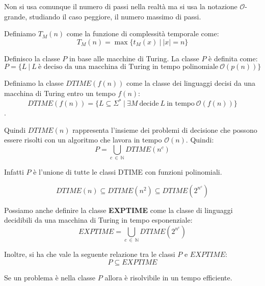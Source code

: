 Non si usa comunque il numero di passi nella realtà ma si usa la notazione 
$\mathcal{O}$-grande, studiando il caso peggiore, il numero massimo di passi.
\begin{definizione}
    Definiamo $T_M(n)$ come la funzione di complessità temporale come: 
    \begin{equation}
        T_M(n) = \max \{t_M(x) \ | \ |x| = n\}
    \end{equation}
\end{definizione}
\begin{definizione}
    Definisco la classe $P$ in base alle macchine di Turing. La classe $P$ è definita come:
    \begin{equation}
        P = \{L \ | \ L \ \text{è deciso da una macchina di Turing in tempo polinomiale} \ \mathcal{O}(p(n))\}
    \end{equation}
\end{definizione}
\begin{definizione}
    Definiamo la classe $DTIME(f(n))$ come la classe dei linguaggi decisi da una 
    macchina di Turing entro un tempo $f(n)$:
    \begin{equation}
        DTIME(f(n)) = \{L \subseteq \Sigma^{\ast} \ | \ \exists M \ \text{decide} \ L \ \text{in tempo} \ \mathcal{O}(f(n)) \}
    \end{equation}$$$$. 
    
    Quindi $DTIME(n)$ rappresenta l'insieme dei problemi di decisione che possono 
    essere risolti con un algoritmo che lavora in tempo $\mathcal{O}(n)$. Quindi:
    \begin{equation}
        P = \bigcup_{c \ \in \ \mathbb{N}} DTIME(n^c)
    \end{equation}
    
    Infatti $P$ è l'unione di tutte le classi DTIME con funzioni polinomiali.
\end{definizione}
\begin{equation}
    DTIME(n) \subseteq DTIME(n^2) \subseteq DTIME(2^{n^c})
\end{equation}

Possiamo anche definire la classe \textbf{EXPTIME} come la classe di linguaggi 
decidibili da una macchina di Turing in tempo esponenziale: 
\begin{equation}
    EXPTIME =  \bigcup_{c \ \in \ \mathbb{N}} DTIME(2^{n^c})
\end{equation}

Inoltre, si ha che vale la seguente relazione tra le classi $P$ e $EXPTIME$: 
\begin{equation}
    P \subseteq EXPTIME
\end{equation}
\begin{teorema}
    Se un problema è nella classe $P$ allora è risolvibile in un tempo efficiente.
\end{teorema}

